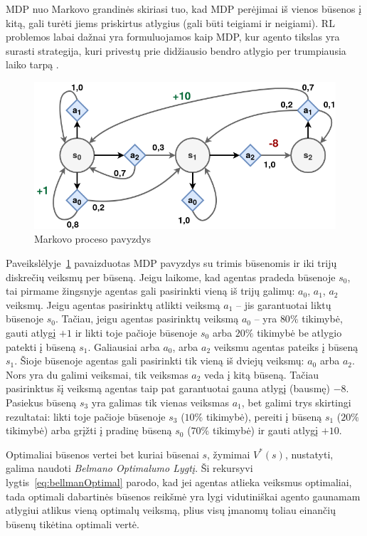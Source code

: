 \documentclass{VUMIFPSbakalaurinis}
\begin{document}
{	MDP nuo Markovo grandinės skiriasi tuo, kad MDP perėjimai iš vienos būsenos į kitą, gali turėti jiems priskirtus atlygius (gali būti teigiami ir neigiami). RL problemos labai dažnai yra formuluojamos kaip MDP, kur agento tikslas yra surasti strategija, kuri privestų prie didžiausio bendro atlygio per trumpiausia laiko tarpą \cite{handson}.\par
	
	\begin{figure}[H]
		\centering
		\includegraphics[scale=0.5]{img/mdp}
		\caption{Markovo proceso pavyzdys}
		\label{img:mdp}
	\end{figure} 
	
	Paveikslėlyje~\ref{img:mdp} pavaizduotas MDP pavyzdys su trimis būsenomis ir iki trijų diskrečių veiksmų per būseną. Jeigu laikome, kad agentas pradeda būsenoje \(s_0\), tai pirmame žingsnyje agentas gali pasirinkti vieną iš trijų galimų: \(a_0\), \(a_1\), \(a_2\) veiksmų. Jeigu agentas pasirinktų atlikti veiksmą \(a_1\) -- jis garantuotai liktų būsenoje \(s_0\). Tačiau, jeigu agentas pasirinktų veiksmą \(a_0\) -- yra \(80\%\) tikimybė, gauti atlygį \(+1\) ir likti toje pačioje būsenoje \(s_0\) arba \(20\%\) tikimybė be atlygio patekti į būseną \(s_1\). Galiausiai arba \(a_0\), arba \(a_2\) veiksmu agentas pateiks į būseną \(s_1\). Šioje būsenoje agentas gali pasirinkti tik vieną iš dviejų veiksmų: \(a_0\) arba \(a_2\). Nors yra du galimi veiksmai, tik veiksmas \(a_2\) veda į kitą būseną. Tačiau pasirinktus šį veiksmą agentas taip pat garantuotai gauna atlygį (bausmę) \(-8\). Pasiekus būseną \(s_3\) yra galimas tik vienas veiksmas \(a_1\), bet galimi trys skirtingi rezultatai: likti toje pačioje būsenoje \(s_3\) (\(10\%\) tikimybė), pereiti į būseną \(s_1\) (\(20\%\) tikimybė) arba grįžti į pradinę būseną \(s_0\) (\(70\%\) tikimybė) ir gauti atlygį \(+10\).\par
	
	Optimaliai būsenos vertei bet kuriai būsenai \(s\), žymimai \(V^*(s)\), nustatyti, galima naudoti \textit{Belmano Optimalumo Lygtį}. Ši rekursyvi lygtis~\ref{eq:bellmanOptimal} parodo, kad jei agentas atlieka veiksmus optimaliai, tada optimali dabartinės būsenos reikšmė yra lygi vidutiniškai agento gaunamam atlygiui atlikus vieną optimalų veiksmą, plius visų įmanomų toliau einančių būsenų tikėtina optimali vertė.
	
}
\end{document}
